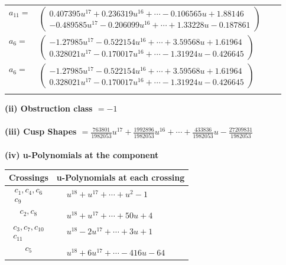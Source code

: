 \documentclass[1p]{elsarticle_modified}
\theoremstyle{definition}
\begin{document}
\begin{tabular}{m{7pt} m{180pt} m{7pt} m{180pt} }
\flushright $a_{11}=$&$\begin{pmatrix}0.407395 u^{17}+0.236319 u^{16}+\cdots-0.106565 u+1.88146\\-0.489585 u^{17}-0.206099 u^{16}+\cdots+1.33228 u-0.187861\end{pmatrix}$ \\
\flushright $a_{6}=$&$\begin{pmatrix}-1.27985 u^{17}-0.522154 u^{16}+\cdots+3.59568 u+1.61964\\0.328021 u^{17}-0.170017 u^{16}+\cdots-1.31924 u-0.426645\end{pmatrix}$\\ \flushright $a_{6}=$&$\begin{pmatrix}-1.27985 u^{17}-0.522154 u^{16}+\cdots+3.59568 u+1.61964\\0.328021 u^{17}-0.170017 u^{16}+\cdots-1.31924 u-0.426645\end{pmatrix}$\\&\end{tabular}
\flushleft \textbf{(ii) Obstruction class $= -1$}\\~\\
\flushleft \textbf{(iii) Cusp Shapes $= \frac{763801}{1982053} u^{17}+\frac{1992896}{1982053} u^{16}+\cdots+\frac{433836}{1982053} u-\frac{27209831}{1982053}$}\\~\\
\newpage\renewcommand{\arraystretch}{1}
\flushleft \textbf{(iv) u-Polynomials at the component}\newline \\
\begin{tabular}{m{50pt}|m{274pt}}
Crossings & \hspace{64pt}u-Polynomials at each crossing \\
\hline $$\begin{aligned}c_{1},c_{4},c_{6}\\c_{9}\end{aligned}$$&$\begin{aligned}
&u^{18}+u^{17}+\cdots+u^2-1
\end{aligned}$\\
\hline $$\begin{aligned}c_{2},c_{8}\end{aligned}$$&$\begin{aligned}
&u^{18}+u^{17}+\cdots+50 u+4
\end{aligned}$\\
\hline $$\begin{aligned}c_{3},c_{7},c_{10}\\c_{11}\end{aligned}$$&$\begin{aligned}
&u^{18}-2 u^{17}+\cdots+3 u+1
\end{aligned}$\\
\hline $$\begin{aligned}c_{5}\end{aligned}$$&$\begin{aligned}
&u^{18}+6 u^{17}+\cdots-416 u-64
\end{aligned}$\\
\hline
\end{tabular}\\~\\
\end{document}
